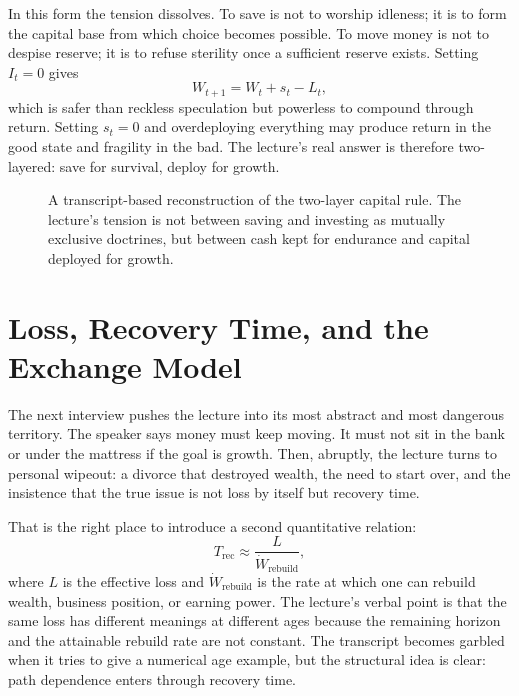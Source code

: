 In this form the tension dissolves. To save is not to worship idleness; it is to form the capital base from which choice becomes possible. To move money is not to despise reserve; it is to refuse sterility once a sufficient reserve exists. Setting \(I_t=0\) gives
\begin{equation}
W_{t+1}=W_t+s_t-L_t,
\end{equation}
which is safer than reckless speculation but powerless to compound through return. Setting \(s_t=0\) and overdeploying everything may produce return in the good state and fragility in the bad. The lecture's real answer is therefore two-layered: save for survival, deploy for growth.

\begin{figure}
\centering
{}
\caption{A transcript-based reconstruction of the two-layer capital rule. The lecture's tension is not between saving and investing as mutually exclusive doctrines, but between cash kept for endurance and capital deployed for growth.}
\end{figure}

\section{Loss, Recovery Time, and the Exchange Model}

The next interview pushes the lecture into its most abstract and most dangerous territory. The speaker says money must keep moving. It must not sit in the bank or under the mattress if the goal is growth. Then, abruptly, the lecture turns to personal wipeout: a divorce that destroyed wealth, the need to start over, and the insistence that the true issue is not loss by itself but recovery time.

That is the right place to introduce a second quantitative relation:
\begin{equation}
T_{\text{rec}} \approx \frac{L}{\dot W_{\text{rebuild}}},
\end{equation}
where \(L\) is the effective loss and \(\dot W_{\text{rebuild}}\) is the rate at which one can rebuild wealth, business position, or earning power. The lecture's verbal point is that the same loss has different meanings at different ages because the remaining horizon and the attainable rebuild rate are not constant. The transcript becomes garbled when it tries to give a numerical age example, but the structural idea is clear: path dependence enters through recovery time.

